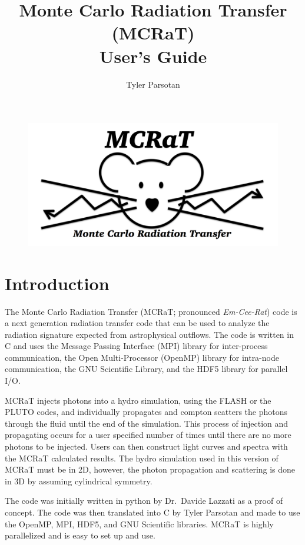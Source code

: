 \documentclass[12pt,a4paper]{article}
\title{Monte Carlo Radiation Transfer (MCRaT)\\User's Guide}
\author{Tyler Parsotan}
\date{}
\begin{document}
\begin{figure}
\centering
\includegraphics[width=\linewidth]{MCRaT_Logo}
\end{figure}
\maketitle

\tableofcontents
\newpage

\section{Introduction}
The Monte Carlo Radiation Transfer (MCRaT; pronounced \textit{Em-Cee-Rat}) code is a next generation radiation transfer code that can be used to analyze the radiation signature expected from astrophysical outflows. The code is written in C and uses the Message Passing Interface (MPI) library for inter-process communication, the Open Multi-Processor (OpenMP) library for intra-node communication, the GNU Scientific Library, and the HDF5 library for parallel I/O.

MCRaT injects photons into a hydro simulation, using the FLASH or the PLUTO codes, and individually propagates and compton scatters the photons through the fluid until the end of the simulation. This process of injection and propagating occurs for a user specified number of times until there are no more photons to be injected. Users can then construct light curves and spectra with the MCRaT calculated results. The hydro simulation used in this version of MCRaT must be in 2D, however, the photon propagation and scattering is done in 3D by assuming cylindrical symmetry.

The code was initially written in python by Dr.\ Davide Lazzati as a proof of concept. The code was then translated into C by Tyler Parsotan and made to use the OpenMP, MPI, HDF5, and GNU Scientific libraries. MCRaT is highly parallelized and is easy to set up and use.
\end{document}
